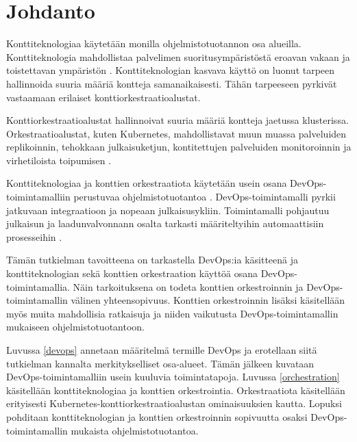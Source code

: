 \chapter{Johdanto\label{intro}}

Konttiteknologiaa käytetään monilla ohjelmistotuotannon osa alueilla.
Konttiteknologia mahdollistaa palvelimen suoritusympäristöstä eroavan vakaan ja toistettavan ympäristön \cite{Watada19}.
Konttiteknologian kasvava käyttö on luonut tarpeen hallinnoida suuria määriä kontteja samanaikaisesti.
Tähän tarpeeseen pyrkivät vastaamaan erilaiset konttiorkestraatioalustat.

Konttiorkestraatioalustat hallinnoivat suuria määriä kontteja jaetussa klusterissa.
Orkestraatioalustat, kuten Kubernetes, mahdollistavat muun muassa palveluiden replikoinnin, tehokkaan julkaisuketjun, kontitettujen palveluiden monitoroinnin ja virhetiloista toipumisen \cite{Khan17}.

Konttiteknologiaa ja konttien orkestraatiota käytetään usein osana DevOps-toimintamalliin perustuvaa ohjelmistotuotantoa \cite{Kang16, Narasimhulu23}.
DevOps-toimintamalli pyrkii jatkuvaan integraatioon ja nopeaan julkaisusykliin.
Toimintamalli pohjautuu julkaisun ja laadunvalvonnann osalta tarkasti määriteltyihin automaattisiin prosesseihin \cite{Jabbari16}.

Tämän tutkielman tavoitteena on tarkastella DevOps:ia käsitteenä ja konttiteknologian sekä konttien orkestraation käyttöä osana DevOps-toimintamallia.
Näin tarkoituksena on todeta konttien orkestroinnin ja DevOps-toimintamallin välinen yhteensopivuus.
Konttien orkestroinnin lisäksi käsitellään myös muita mahdollisia ratkaisuja ja niiden vaikutusta DevOps-toimintamallin mukaiseen ohjelmistotuotantoon.

Luvussa \ref{devops} annetaan määritelmä termille DevOps ja erotellaan siitä tutkielman kannalta merkitykselliset osa-alueet.
Tämän jälkeen kuvataan DevOps-toimintamalliin usein kuuluvia toimintatapoja.
Luvussa \ref{orchestration} käsitellään konttiteknologiaa ja konttien orkestrointia.
Orkestraatiota käsitellään erityisesti Kubernetes-konttiorkestraatioalustan ominaisuuksien kautta.
Lopuksi pohditaan konttiteknologian ja konttien orkestroinnin sopivuutta osaksi DevOps-toimintamallin mukaista ohjelmistotuotantoa.
